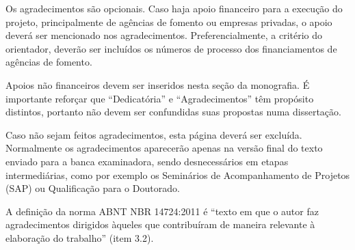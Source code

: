 \begin{agradecimentos}
Os agradecimentos são opcionais. Caso haja apoio financeiro para a execução do projeto, principalmente de agências de fomento ou empresas privadas, o apoio deverá ser mencionado nos agradecimentos. Preferencialmente, a critério do orientador, deverão ser incluídos os números de processo dos financiamentos de agências de fomento.

Apoios não financeiros devem ser inseridos nesta seção da monografia. É importante reforçar que “Dedicatória” e “Agradecimentos” têm propósito distintos, portanto não devem ser confundidas suas propostas numa dissertação.

Caso não sejam feitos agradecimentos, esta página deverá ser excluída. Normalmente os agradecimentos aparecerão apenas na versão final do texto enviado para a banca examinadora, sendo desnecessários em etapas intermediárias, como por exemplo os Seminários de Acompanhamento de Projetos (SAP) ou Qualificação para o Doutorado.

A definição da norma ABNT NBR 14724:2011 é “texto em que o autor faz agradecimentos dirigidos àqueles que contribuíram de maneira relevante à elaboração do trabalho” (item 3.2).

\end{agradecimentos}
